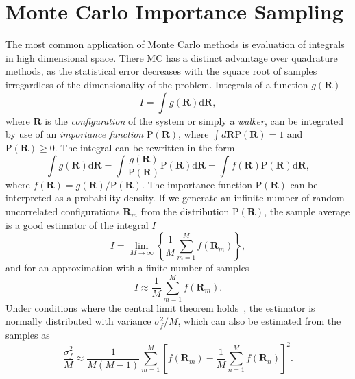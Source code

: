 \section{Monte Carlo Importance Sampling}
\label{sec:Impl-MCIP}
The most common application of Monte Carlo methods is evaluation of integrals in high dimensional space. There MC has a distinct advantage over quadrature methods, as the statistical error decreases with the square root of samples irregardless of the dimensionality of the problem. Integrals of a function $g(\mathbf{R})$
\begin{equation}
I=\int g(\mathbf{R}) \mathrm{d} \mathbf{R},
\end{equation}
where $\mathbf{R}$ is the \emph{configuration} of the system or simply a \emph{walker}, can be integrated by use of an \emph{importance function} $\mathrm{P}(\mathbf{R})$, where $\int d \mathbf{R} \text{P}(\mathbf{R})=1$ and $\mathrm{P} (\mathbf{R}) \geq 0$. The integral can be rewritten in the form
\begin{equation}
\int g(\mathbf{R}) \mathrm{d} \mathbf{R} = \int \frac{g(\mathbf{R})}{\mathrm{P}(\mathbf{R})} \mathrm{P}(\mathbf{R}) \mathrm{d} \mathbf{R} = \int f(\mathbf{R})\mathrm{P}(\mathbf{R}) \mathrm{d} \mathbf{R},
\end{equation}
where $f(\mathbf{R}) = g(\mathbf{R}) / \mathrm{P}(\mathbf{R})$.
The importance function $\mathrm{P}(\mathbf{R})$ can be interpreted as a probability density. If we generate an infinite number of random uncorrelated configurations $\mathbf{R}_m$ from the distribution $\mathrm{P}(\mathbf{R})$, the sample average is a good estimator of the integral $I$
\begin{equation}
I=\lim _{M \rightarrow \infty}\left\{\frac{1}{M} \sum_{m=1}^{M} f\left(\mathbf{R}_{m}\right)\right\},
\end{equation}
and for an approximation with a finite number of samples
\begin{equation}
I \approx \frac{1}{M} \sum_{m=1}^{M} f\left(\mathbf{R}_{m}\right).
\end{equation}
Under conditions where the central limit theorem holds~\cite{foulkes2001quantum}, the estimator is normally distributed with variance $\sigma_{f}^{2}/M$, which can also be estimated from the samples as
\begin{equation}
\frac{\sigma_{f}^{2}}{M} \approx \frac{1}{M(M-1)} \sum_{m=1}^{M}\left[f\left(\mathbf{R}_{m}\right)-\frac{1}{M} \sum_{n=1}^{M} f\left(\mathbf{R}_{n}\right)\right]^{2}.
\end{equation}


